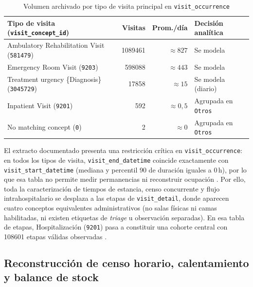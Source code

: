 \begin{table}[htbp]
\caption{Volumen archivado por tipo de visita principal en \texttt{visit\_occurrence}}
\label{tab:volumen_visitas}
{\singlespacing\small
\begin{tabularx}{\textwidth}{@{}Y r r L{0.24\textwidth}@{}}
\toprule
Tipo de visita (\texttt{visit\_concept\_id}) & Visitas & Prom./día & Decisión analítica \\
\midrule
Ambulatory Rehabilitation Visit (\texttt{581479}) & \num{1089461} & $\approx 827$ & Se modela \\
Emergency Room Visit (\texttt{9203}) & \num{598088} & $\approx 443$ & Se modela \\
Treatment urgency \{Diagnosis\} (\texttt{3045729}) & \num{17858} & $\approx 15$ & Se modela (diario) \\
Inpatient Visit (\texttt{9201}) & \num{592} & $\approx 0{,}5$ & Agrupada en \texttt{Otros} \\
No matching concept (\texttt{0}) & \num{2} & $\approx 0$ & Agrupada en \texttt{Otros} \\
\bottomrule
\end{tabularx}}
\end{table}

El extracto documentado presenta una restricción crítica en \texttt{visit\_occurrence}: en todos los tipos de visita, \texttt{visit\_end\_datetime} coincide exactamente con \texttt{visit\_start\_datetime} (mediana y percentil 90 de duración iguales a 0\,h), por lo que esa tabla no permite medir permanencias ni reconstruir ocupación \parencite{mediflow2026inventario}. Por ello, toda la caracterización de tiempos de estancia, censo concurrente y flujo intrahospitalario se desplaza a las etapas de \texttt{visit\_detail}, donde aparecen cuatro conceptos equivalentes administrativos (no salas físicas ni camas habilitadas, ni existen etiquetas de \textit{triage} u observación separadas). En esa tabla de etapas, Hospitalización (\texttt{9201}) pasa a constituir una cohorte central con \num{108601} etapas válidas observadas \parencite{mediflow2026saturacion}.

\subsection{Reconstrucción de censo horario, calentamiento y balance de stock}

